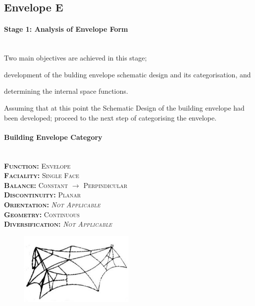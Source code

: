 \clearpage	
\subsection{Envelope E}

\paragraph{Stage 1: Analysis of Envelope Form}\mbox{}\\[2mm]

Two main objectives are achieved in this stage; \begin{inparaenum}[a)] \item development of the bulding envelope schematic design and its categorisation, and \item determining the internal space functions.\end{inparaenum}

Assuming that at this point the Schematic Design of the building envelope had been developed; proceed to the next step of categorising the envelope.

\setlength{\columnseprule}{0pt}
\begin{multicols}{2}
	\paragraph{Building Envelope Category}\mbox{}\\
	\vspace {0.5cm}	
	\small \textsc{\textbf{Function:} Envelope\\
	\vspace {0.3cm}
	\textbf{Faciality:} Single Face\\
	\vspace {0.3cm}
	\textbf{Balance:} Constant $\rightarrow$ Perpindicular\\
	\vspace {0.3cm}
	\textbf{Discontinuity:} Planar\\
	\vspace {0.3cm}
	\textbf{Orientation:} \emph{Not Applicable}\\
	\vspace {0.3cm}
	\textbf{Geometry:} Continuous\\
	\vspace {0.3cm}
	\textbf{Diversification:} \emph{Not Applicable}\\}
	\normalsize
	\columnbreak
	\vspace{5.5cm}
	\begin{figure}[H]
		\centering
		\includegraphics[width=0.5\textwidth]{./Images/22-Envelope13}
	\end{figure}
\end{multicols}
\vspace{-5mm}

